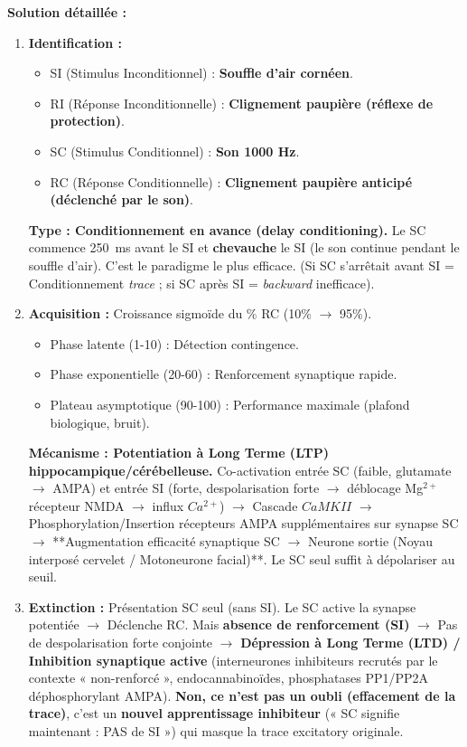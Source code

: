 \documentclass[11pt]{article}
\begin{document}
\begin{exoresolu}
\tcblower
\textbf{Solution détaillée :}
\begin{enumerate}
    \item \textbf{Identification :}
    \begin{itemize}
        \item SI (Stimulus Inconditionnel) : \textbf{Souffle d'air cornéen}.
        \item RI (Réponse Inconditionnelle) : \textbf{Clignement paupière (réflexe de protection)}.
        \item SC (Stimulus Conditionnel) : \textbf{Son 1000 Hz}.
        \item RC (Réponse Conditionnelle) : \textbf{Clignement paupière anticipé (déclenché par le son)}.
    \end{itemize}
    \textbf{Type : Conditionnement \textbf{en avance (delay conditioning)}.} Le SC commence \SI{250}{ms} avant le SI et \textbf{chevauche} le SI (le son continue pendant le souffle d'air). C'est le paradigme le plus efficace. (Si SC s'arrêtait avant SI = Conditionnement \textit{trace} ; si SC après SI = \textit{backward} inefficace).
    \item \textbf{Acquisition :} Croissance sigmoïde du \% RC (10\% $\rightarrow$ 95\%).
    \begin{itemize}
        \item Phase latente (1-10) : Détection contingence.
        \item Phase exponentielle (20-60) : Renforcement synaptique rapide.
        \item Plateau asymptotique (90-100) : Performance maximale (plafond biologique, bruit).
    \end{itemize}
    \textbf{Mécanisme : Potentiation à Long Terme (LTP) hippocampique/cérébelleuse.} Co-activation entrée SC (faible, glutamate $\rightarrow$ AMPA) et entrée SI (forte, despolarisation forte $\rightarrow$ déblocage Mg$^{2+}$ récepteur NMDA $\rightarrow$ influx $Ca^{2+}$) $\rightarrow$ Cascade $CaMKII$ $\rightarrow$ Phosphorylation/Insertion récepteurs AMPA supplémentaires sur synapse SC $\rightarrow$ **Augmentation efficacité synaptique SC $\rightarrow$ Neurone sortie (Noyau interposé cervelet / Motoneurone facial)**. Le SC seul suffit à dépolariser au seuil.
    \item \textbf{Extinction :} Présentation SC seul (sans SI). Le SC active la synapse potentiée $\rightarrow$ Déclenche RC. Mais \textbf{absence de renforcement (SI)} $\rightarrow$ Pas de despolarisation forte conjointe $\rightarrow$ \textbf{Dépression à Long Terme (LTD) / Inhibition synaptique active} (interneurones inhibiteurs recrutés par le contexte « non-renforcé », endocannabinoïdes, phosphatases PP1/PP2A déphosphorylant AMPA). \textbf{Non, ce n'est pas un oubli (effacement de la trace)}, c'est un \textbf{nouvel apprentissage inhibiteur} (« SC signifie maintenant : PAS de SI ») qui masque la trace excitatory originale.

\end{enumerate}
\end{exoresolu}
\end{document}

